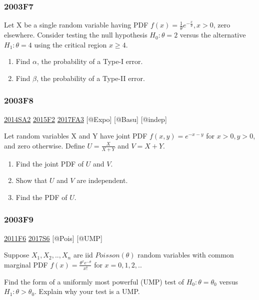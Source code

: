 \documentclass[6pt,twocolumn,Portrait]{article}
\begin{document}
\hypertarget{f7-1}{%
\subsubsection{2003F7}\label{f7-1}}

Let X be a single random variable having PDF
\(f(x)=\frac1{\theta}e^{-\frac{x}{\theta}},x>0\), zero elsewhere.
Consider testing the null hypothesis \(H_0:\theta=2\) versus the
alternative \(H_1:\theta=4\) using the critical region \(x\ge4\).

\begin{enumerate}
\def\labelenumi{\Alph{enumi})}
\item
  Find \(\alpha\), the probability of a Type-I error.
\item
  Find \(\beta\), the probability of a Type-II error.
\end{enumerate}

\hypertarget{f8-1}{%
\subsubsection{2003F8}\label{f8-1}}

\protect\hyperlink{sa2-2}{2014SA2} \protect\hyperlink{f2-5}{2015F2}
\protect\hyperlink{fa3-3}{2017FA3} {[}@Expo{]} {[}@Basu{]} {[}@indep{]}

Let random variables X and Y have joint PDF \(f(x,y)=e^{-x-y}\) for
\(x>0,y>0\), and zero otherwise. Define \(U=\frac{X}{X+Y}\) and
\(V =X+Y\).

\begin{enumerate}
\def\labelenumi{\Alph{enumi})}
\item
  Find the joint PDF of \(U\) and \(V\).
\item
  Show that \(U\) and \(V\) are independent.
\item
  Find the PDF of \(U\).
\end{enumerate}

\hypertarget{f9-1}{%
\subsubsection{2003F9}\label{f9-1}}

\protect\hyperlink{f6-4}{2011F6} \protect\hyperlink{s6-4}{2017S6}
{[}@Pois{]} {[}@UMP{]}

Suppose \(X_1,X_2,..,X_n\) are iid \(Poisson(\theta)\) random variables
with common marginal PDF \(f(x)=\frac{\theta^xe^{-\theta}}{x!}\) for
\(x = 0,1,2,..\)

Find the form of a uniformly most powerful (UMP) test of
\(H_0:\theta=\theta_0\) versus \(H_1:\theta>\theta_0\). Explain why your
test is a UMP.
\end{document}
